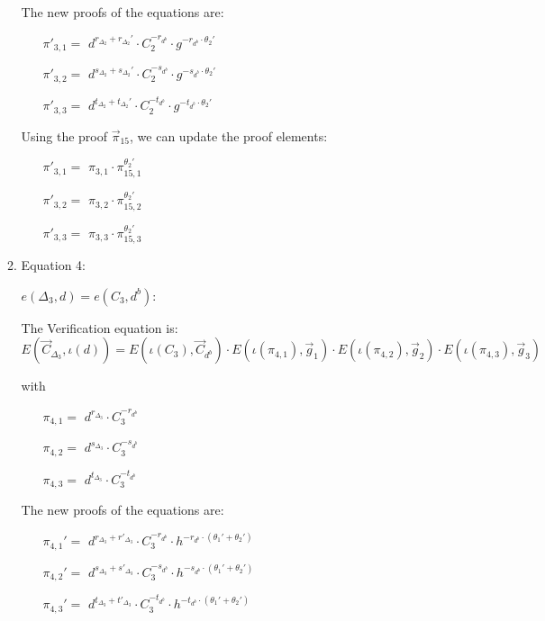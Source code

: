 \begin{description}
\begin{enumerate}
\begin{enumerate}
      The new proofs of the equations are:
      
      \begin{itemize}
      \item[$\pi'_{3,1} = $] $d^{r_{\Delta_2} + r_{\Delta_2}'} \cdot C_2^{-r_{d^b}} \cdot g^{-r_{d^b} \cdot \theta_2'}$    
      \item[$\pi'_{3,2} = $] $d^{s_{\Delta_2} + s_{\Delta_2}'} \cdot C_2^{-s_{d^b}} \cdot g^{-s_{d^b} \cdot \theta_2'}$    
      \item[$\pi'_{3,3} = $] $d^{t_{\Delta_2} + t_{\Delta_2}'} \cdot C_2^{-t_{d^b}} \cdot g^{-t_{d^b} \cdot \theta_2'}$
      \end{itemize}

      Using the proof $\vec{\pi}_{15}$, we can update the proof elements:

      \begin{itemize}
      \item[$\pi'_{3,1} = $] $\pi_{3,1} \cdot \pi_{15,1}^{\theta_2'}$    
      \item[$\pi'_{3,2} = $] $\pi_{3,2} \cdot \pi_{15,2}^{\theta_2'}$    
      \item[$\pi'_{3,3} = $] $\pi_{3,3} \cdot \pi_{15,3}^{\theta_2'}$
      \end{itemize}


      
    \item Equation 4:

      $e(\boxed{\Delta_3},d) = e(C_3, \boxed{d^b})$:
      
      The Verification equation is:  $E(\vec{C}_{\Delta_3}, \iota(d)) = E(\iota(C_3), \vec{C}_{d^b}) \cdot E(\iota(\pi_{4,1}), \vec{g}_1)\cdot E(\iota(\pi_{4,2}), \vec{g}_2)\cdot E(\iota(\pi_{4,3}), \vec{g}_3)$
      
      with
      \begin{itemize}
      \item[$\pi_{4,1} = $] $d^{r_{\Delta_3}} \cdot C_3^{-r_{d^b}}$
      \item[$\pi_{4,2} = $] $d^{s_{\Delta_3}} \cdot C_3^{-s_{d^b}}$
      \item[$\pi_{4,3} = $] $d^{t_{\Delta_3}} \cdot C_3^{-t_{d^b}}$
      \end{itemize}

      The new proofs of the equations are:
      \begin{itemize}
      \item[$\pi_{4,1}' = $] $d^{r_{\Delta_3} + r'_{\Delta_3}} \cdot C_3^{-r_{d^b}} \cdot h^{- r_{d^b} \cdot (\theta_1'+ \theta_2')}$
      \item[$\pi_{4,2}' = $] $d^{s_{\Delta_3} + s'_{\Delta_3}} \cdot C_3^{-s_{d^b}} \cdot h^{- s_{d^b} \cdot (\theta_1'+ \theta_2')}$
      \item[$\pi_{4,3}' = $] $d^{t_{\Delta_3} + t'_{\Delta_3}} \cdot C_3^{-t_{d^b}} \cdot h^{- t_{d^b} \cdot (\theta_1'+ \theta_2')}$  
      \end{itemize}
      

\end{enumerate}
\end{enumerate}
\end{description}
